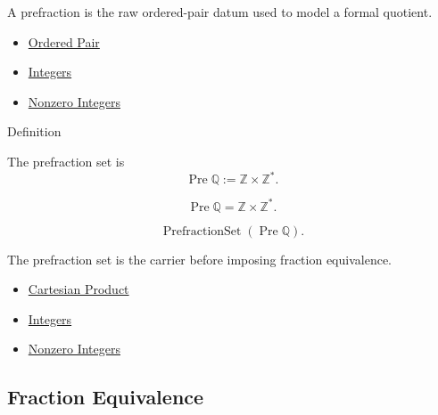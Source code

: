 \begin{remark*}[Interpretation]
A prefraction is the raw ordered-pair datum used to model a formal quotient.
\end{remark*}

\begin{dependencies}
\begin{itemize}
  \item \hyperref[def:ordered-pair]{Ordered Pair}
  \item \hyperref[def:integers]{Integers}
  \item \hyperref[def:nonzero-integers]{Nonzero Integers}
\end{itemize}
\end{dependencies}

\begin{definitionbox}{Definition}
\begin{definition}
\label{def:prefraction-set}
The prefraction set is
\[
\operatorname{Pre}\mathbb{Q}:=\mathbb{Z}\times\mathbb{Z}^{\ast}.
\]
\end{definition}
\end{definitionbox}

\begin{remark*}
\[
\operatorname{Pre}\mathbb{Q}=\mathbb{Z}\times\mathbb{Z}^{\ast}.
\]
\end{remark*}

\begin{remark*}
\[
\operatorname{PrefractionSet}(\operatorname{Pre}\mathbb{Q}).
\]
\end{remark*}

\begin{remark*}[Interpretation]
The prefraction set is the carrier before imposing fraction equivalence.
\end{remark*}

\begin{dependencies}
\begin{itemize}
  \item \hyperref[def:cartesian-product-rel]{Cartesian Product}
  \item \hyperref[def:integers]{Integers}
  \item \hyperref[def:nonzero-integers]{Nonzero Integers}
\end{itemize}
\end{dependencies}

\subsection*{Fraction Equivalence}

